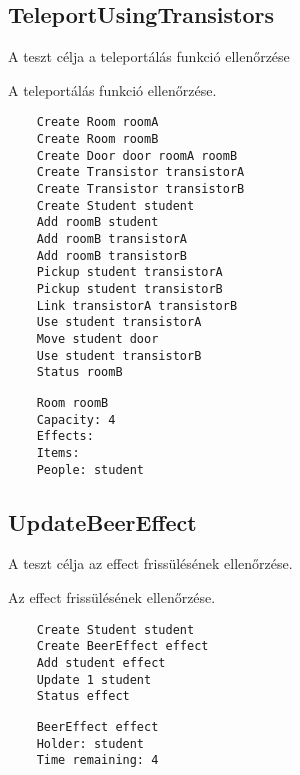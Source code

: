 \subsection{TeleportUsingTransistors}
\begin{test-case-description}
    A teszt célja a teleportálás funkció ellenőrzése
\end{test-case-description}
\begin{test-case-function}
    A teleportálás funkció ellenőrzése.
\end{test-case-function}
\begin{test-case-input}
    \begin{verbatim}
    Create Room roomA
    Create Room roomB
    Create Door door roomA roomB
    Create Transistor transistorA
    Create Transistor transistorB
    Create Student student
    Add roomB student
    Add roomB transistorA
    Add roomB transistorB
    Pickup student transistorA
    Pickup student transistorB
    Link transistorA transistorB
    Use student transistorA
    Move student door
    Use student transistorB
    Status roomB
    \end{verbatim}
\end{test-case-input}
\begin{test-case-output}
    \begin{verbatim}
    Room roomB
    Capacity: 4
    Effects:
    Items:
    People: student
    \end{verbatim}
\end{test-case-output}

\subsection{UpdateBeerEffect}
\begin{test-case-description}
    A teszt célja az effect frissülésének ellenőrzése.
\end{test-case-description}
\begin{test-case-function}
    Az effect frissülésének ellenőrzése.
\end{test-case-function}
\begin{test-case-input}
    \begin{verbatim}
    Create Student student
    Create BeerEffect effect
    Add student effect
    Update 1 student
    Status effect
    \end{verbatim}
\end{test-case-input}
\begin{test-case-output}
    \begin{verbatim}
    BeerEffect effect
    Holder: student
    Time remaining: 4
    \end{verbatim}
\end{test-case-output}

